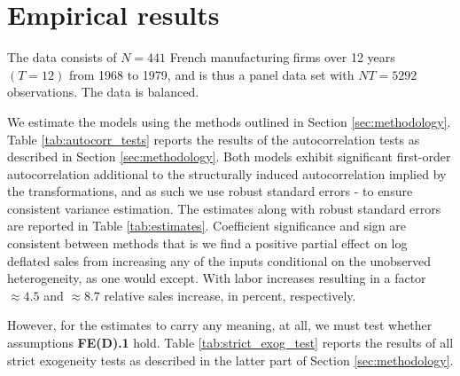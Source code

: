 \section{Empirical results}

The data consists of $N = 441$ French manufacturing firms over 12 years $(T=12)$ from 1968 to 1979, and is thus a panel data set with $NT = 5292$ observations. The data is balanced.  

We estimate the models using the methods outlined in Section \ref{sec:methodology}. Table \ref{tab:autocorr_tests} reports the results of the autocorrelation tests as described in Section \ref{sec:methodology}. Both models exhibit significant first-order autocorrelation additional to the structurally induced autocorrelation implied by the transformations, and as such we use robust standard errors  - to ensure consistent variance estimation. The estimates along with robust standard errors are reported in Table \ref{tab:estimates}. Coefficient significance and sign are consistent between methods that is we find a positive partial effect on log deflated sales from increasing any of the inputs conditional on the unobserved heterogeneity, as one would except. With labor increases resulting in a factor $\approx 4.5$ and $\approx 8.7$ relative sales increase, in percent, respectively. 



However, for the estimates to carry any meaning, at all, we must test whether assumptions \textbf{FE(D).1} hold. Table \ref{tab:strict_exog_test} reports the results of all strict exogeneity tests as described in the latter part of Section \ref{sec:methodology}.



